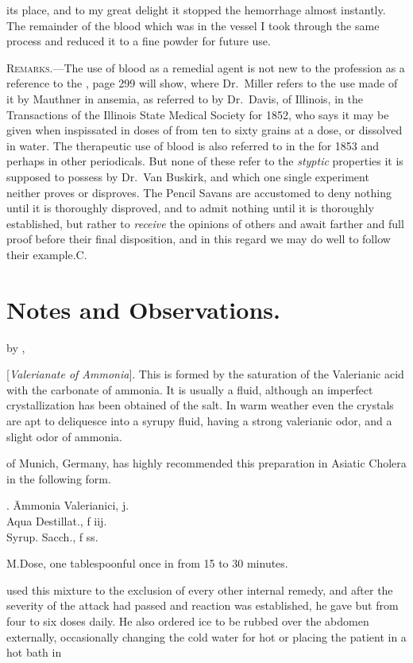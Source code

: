 its place, and to my great delight it stopped the hemorrhage almost
instantly. The remainder of the blood which was in the vessel I took
through the same process and reduced it to a fine powder for future use.

\textsc{Remarks}.---The use of blood as a remedial agent is not new to the
profession as a reference to the , page 299 will show, where
Dr.~Miller refers to the use made of it by Mauthner in ansemia, as
referred to by Dr.~Davis, of Illinois, in the Transactions of the Illinois
State Medical Society for 1852, who says it may be given when inspissated
in doses of from ten to sixty grains at a dose, or dissolved in
water. The therapeutic use of blood is also referred to in the 
for 1853 and perhaps in other periodicals. But none of
these refer to the \emph{styptic} properties it is supposed to possess by Dr.~Van
Buskirk, and which one single experiment neither proves or disproves.
The Pencil Savans are accustomed to deny nothing until it is
thoroughly disproved, and to admit nothing until it is thoroughly established,
but rather to \emph{receive} the opinions of others and await farther
and full proof before their final disposition, and in this regard we may
do well to follow their example.\hfill{}C.\quad

\section*{Notes and Observations.}

by , \md

 [\emph{Valerianate of Ammonia}]. This is formed
by the saturation of the Valerianic acid with the carbonate of ammonia.
It is usually a fluid, although an imperfect crystallization has been obtained
of the salt. In warm weather even the crystals are apt to deliquesce
into a syrupy fluid, having a strong valerianic odor, and a
slight odor of ammonia.

 of Munich, Germany, has highly recommended this preparation
in Asiatic Cholera in the following form.

\begin{center}
\begin{tabbing}
  \prescription. \= Ammonia Valerianici, \scruple j. \\
    \> Aqua Destillat., f \ounce iij. \\
    \> Syrup. Sacch., f \ounce ss.
\end{tabbing}
\end{center}

M.\quad{}Dose, one tablespoonful once in from 15 to 30 minutes.

 used this mixture to the exclusion of every other internal
remedy, and after the severity of the attack had passed and reaction
was established, he gave but from four to six doses daily. He also
ordered ice to be rubbed over the abdomen externally, occasionally
changing the cold water for hot or placing the patient in a hot bath in\endinput
